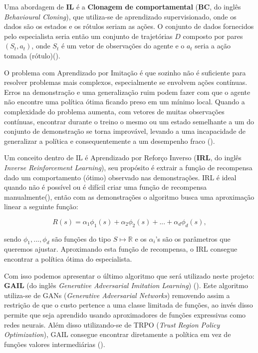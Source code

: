 Uma abordagem de \textbf{IL} é a \textbf{Clonagem de comportamental} (\textbf{BC}, do inglês \textit{Behavioural Cloning}), que utiliza-se de aprendizado supervisionado, onde os dados são os estados e os rótulos seriam as ações. O conjunto de dados fornecidos pelo especialista seria então um conjunto de trajetórias $D$ composto por pares $(S_t, a_t)$, onde $S_t$ é um vetor de observações do agente e o $a_t$ seria a ação tomada (rótulo)().

O problema com Aprendizado por Imitação é que sozinho não é suficiente para resolver problemas mais complexos, especialmente se envolvem ações contínuas. Erros na demonstração e uma generalização ruim podem fazer com que o agente não encontre uma política ótima ficando preso em um mínimo local. Quando a complexidade do problema aumenta, com vetores de muitas observações contínuas, encontrar durante o treino o mesmo ou um estado semelhante a um do conjunto de demonstração se torna improvável, levando a uma incapacidade de generalizar a política e consequentemente a um desempenho fraco ().

Um conceito dentro de IL é Aprendizado por Reforço Inverso (\textbf{IRL}, do inglês \textit{Inverse Reinforcement Learning}), seu propósito é extrair a função de recompensa dado um comportamento (ótimo) observado nas demonstrações. IRL é ideal quando não é possível ou é difícil criar uma função de recompensa manualmente(), então com as demonstrações o algoritmo busca uma aproximação linear a seguinte função:

\begin{equation}
   R(s) = \alpha_1 \phi_1(s) + \alpha_2 \phi_2(s) + ... + \alpha_d \phi_d(s),
\end{equation}

sendo $\phi_1, ..., \phi_d$ são funções do tipo $S \mapsto \mathbb{R}$ e os $\alpha_i$'s são os parâmetros que queremos ajustar. Aproximando esta função de recompensa, o IRL consegue encontrar a política ótima do especialista.

Com isso podemos apresentar o último algoritmo que será utilizado neste projeto: \textbf{GAIL} (do inglês \textit{Generative Adversarial Imitation Learning}) (). Este algoritmo utiliza-se de GANs (\textit{Generative Adversarial Networks}) removendo assim a restrição de que o custo pertence a uma classe limitada de funções, ao invés disso permite que seja aprendido usando aproximadores de funções expressivas como redes neurais. Além disso utilizando-se de TRPO (\textit{Trust Region Policy Optimization}), GAIL consegue encontrar diretamente a política em vez de funções valores intermediárias ().